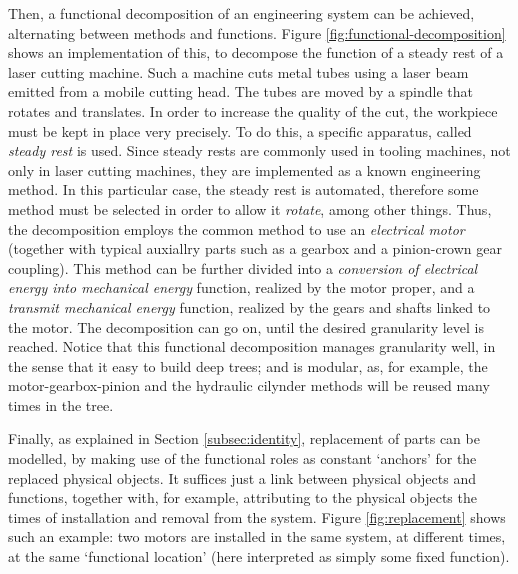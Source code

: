 \documentclass[
]{ceurart}
\begin{document}
Then, a functional decomposition of an engineering system can be achieved, alternating between methods and functions. Figure \ref{fig:functional-decomposition} shows an implementation of this, to decompose the function of a steady rest of a laser cutting machine.
Such a machine cuts metal tubes using a laser beam emitted from a mobile cutting head. The tubes are moved by a spindle that rotates and translates. In order to increase the quality of the cut, the workpiece must be kept in place very precisely. To do this, a specific apparatus, called \textit{steady rest} is used. Since steady rests are commonly used in tooling machines, not only in laser cutting machines, they are implemented as a known engineering method. In this particular case, the steady rest is automated, therefore some method must be selected in order to allow it \textit{rotate}, among other things. Thus, the decomposition employs the common method to use an \textit{electrical motor} (together with typical auxiallry parts such as a gearbox and a pinion-crown gear coupling). This method can be further divided into a \textit{conversion of electrical energy into mechanical energy} function, realized by the motor proper, and a \textit{transmit mechanical energy} function, realized by the gears and shafts linked to the motor. The decomposition can go on, until the desired granularity level is reached. 
Notice that this functional decomposition manages granularity well, in the sense that it easy to build deep trees; and is modular, as, for example, the motor-gearbox-pinion and the hydraulic cilynder methods will be reused many times in the tree.

Finally, as explained in Section \ref{subsec:identity}, replacement of parts can be modelled, by making use of the functional roles as constant `anchors' for the replaced physical objects. It suffices just a link between physical objects and functions, together with, for example, attributing to the physical objects the times of installation and removal from the system. Figure \ref{fig:replacement} shows such an example: two motors are installed in the same system, at different times, at the same `functional location' (here interpreted as simply some fixed function).
\end{document}
